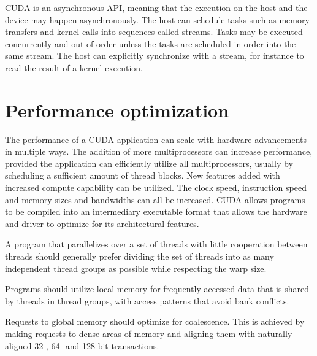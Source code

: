 CUDA is an asynchronous API, meaning that the execution on the host and the device may happen asynchronously. The host can schedule tasks such as memory transfers and kernel calls into sequences called streams. Tasks may be executed concurrently and out of order unless the tasks are scheduled in order into the same stream. The host can explicitly synchronize with a stream, for instance to read the result of a kernel execution.

\section{Performance optimization}

The performance of a CUDA application can scale with hardware advancements in multiple ways. The addition of more multiprocessors can increase performance, provided the application can efficiently utilize all multiprocessors, usually by scheduling a sufficient amount of thread blocks. New features added with increased compute capability can be utilized. The clock speed, instruction speed and memory sizes and bandwidths can all be increased. CUDA allows programs to be compiled into an intermediary executable format that allows the hardware and driver to optimize for its architectural features.

A program that parallelizes over a set of threads with little cooperation between threads should generally prefer dividing the set of threads into as many independent thread groups as possible while respecting the warp size.

Programs should utilize local memory for frequently accessed data that is shared by threads in thread groups, with access patterns that avoid bank conflicts.

Requests to global memory should optimize for coalescence. This is achieved by making requests to dense areas of memory and aligning them with naturally aligned 32-, 64- and 128-bit transactions.
